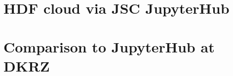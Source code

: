 \documentclass[11pt,a4paper]{article}
\begin{document}

\section{HDF cloud via JSC JupyterHub}
\label{s-hdfcloud-jsc-jhub}


\section{Comparison to JupyterHub at DKRZ}
\label{s-comparison-dkrz}



\end{document}

